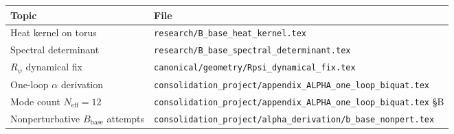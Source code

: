 \documentclass[11pt,a4paper]{article}
\begin{document}
\begin{tabular}{ll}
\hline
Topic & File \\
\hline
Heat kernel on torus & \texttt{research/B\_base\_heat\_kernel.tex} \\
Spectral determinant & \texttt{research/B\_base\_spectral\_determinant.tex} \\
$R_\psi$ dynamical fix & \texttt{canonical/geometry/Rpsi\_dynamical\_fix.tex} \\
One-loop $\alpha$ derivation & \texttt{consolidation\_project/appendix\_ALPHA\_one\_loop\_biquat.tex} \\
Mode count $N_{\mathrm{eff}}=12$ & \texttt{consolidation\_project/appendix\_ALPHA\_one\_loop\_biquat.tex} §B \\
Nonperturbative $B_{\mathrm{base}}$ attempts & \texttt{consolidation\_project/alpha\_derivation/b\_base\_nonpert.tex} \\
\hline
\end{tabular}
\end{document}

